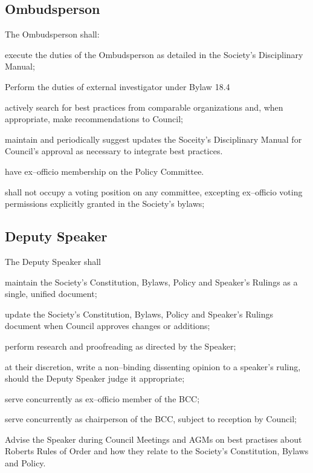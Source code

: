 \subsection{Ombudsperson}
The Ombudsperson shall:
\begin{longenum}[ label*=\thesubsection.\arabic*., align=left]


\item execute the duties of the Ombudsperson as detailed in the Society's Disciplinary Manual; 
\item Perform the duties of external investigator under Bylaw 18.4
\item actively search for best practices from comparable organizations and, when appropriate, make recommendations to Council;
\item maintain and periodically suggest updates the Soceity's Disciplinary Manual for Council's approval
as necessary to integrate best practices.
\item have ex--officio membership on the Policy Committee.
\item shall not occupy a voting position on any committee, excepting ex--officio voting permissions explicitly granted in the Society's bylaws;
\end{longenum}
\subsection{Deputy Speaker}
The Deputy Speaker shall
\begin{longenum}[ label*=\thesubsection.\arabic*., align=left]
\item maintain the Society's Constitution, Bylaws, Policy and Speaker's Rulings as a single, unified document;
\item update the Society's Constitution, Bylaws, Policy and Speaker's Rulings document when Council approves changes or additions;
\item perform research and proofreading as directed by the Speaker;
\item at their discretion, write a non--binding dissenting opinion to a speaker's ruling, should the Deputy Speaker judge it appropriate;
\item serve concurrently as ex--officio member of the BCC;
\item serve concurrently as chairperson of the BCC, subject to reception by Council;
\item Advise the Speaker during Council Meetings and AGMs on best practises about Roberts Rules of Order and how they relate to the Society's Constitution, Bylaws and Policy.

\end{longenum}

